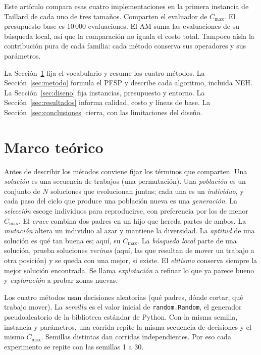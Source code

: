 \documentclass[journal]{IEEEtran}
\begin{document}
Este artículo compara esas cuatro implementaciones en la primera instancia de Taillard de cada uno de tres tamaños. Comparten el evaluador de $C_{\max}$. El presupuesto base es 10\,000 evaluaciones. El AM suma las evaluaciones de su búsqueda local, así que la comparación no iguala el costo total. Tampoco aísla la contribución pura de cada familia: cada método conserva sus operadores y sus parámetros.

La Sección~\ref{sec:marco} fija el vocabulario y resume los cuatro métodos. La Sección~\ref{sec:metodo} formula el PFSP y describe cada algoritmo, incluida NEH. La Sección~\ref{sec:diseno} fija instancias, presupuesto y entorno. La Sección~\ref{sec:resultados} informa calidad, costo y líneas de base. La Sección~\ref{sec:conclusiones} cierra, con las limitaciones del diseño.

\section{Marco teórico}\label{sec:marco}
Antes de describir los métodos conviene fijar los términos que comparten. Una \emph{solución} es una secuencia de trabajos (una permutación). Una \emph{población} es un conjunto de $N$ soluciones que evolucionan juntas; cada una es un \emph{individuo}, y cada paso del ciclo que produce una población nueva es una \emph{generación}. La \emph{selección} escoge individuos para reproducirse, con preferencia por los de menor $C_{\max}$. El \emph{cruce} combina dos padres en un hijo que hereda partes de ambos. La \emph{mutación} altera un individuo al azar y mantiene la diversidad. La \emph{aptitud} de una solución es qué tan buena es; aquí, su $C_{\max}$. La \emph{búsqueda local} parte de una solución, prueba soluciones \emph{vecinas} (aquí, las que resultan de mover un trabajo a otra posición) y se queda con una mejor, si existe. El \emph{elitismo} conserva siempre la mejor solución encontrada. Se llama \emph{explotación} a refinar lo que ya parece bueno y \emph{exploración} a probar zonas nuevas.

Los cuatro métodos usan decisiones aleatorias (qué padres, dónde cortar, qué trabajo mover). La \emph{semilla} es el valor inicial de \texttt{random.Random}, el generador pseudoaleatorio de la biblioteca estándar de Python. Con la misma semilla, instancia y parámetros, una corrida repite la misma secuencia de decisiones y el mismo $C_{\max}$. Semillas distintas dan corridas independientes. Por eso cada experimento se repite con las semillas 1 a 30.
\end{document}
